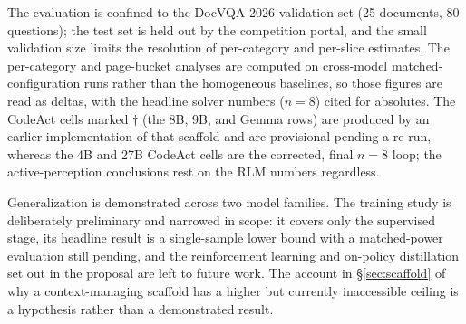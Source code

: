The evaluation is confined to the DocVQA-2026 validation set (25 documents, 80 questions); the test set is held out by the competition portal, and the small validation size limits the resolution of per-category and per-slice estimates. The per-category and page-bucket analyses are computed on cross-model matched-configuration runs rather than the homogeneous baselines, so those figures are read as deltas, with the headline solver numbers ($n{=}8$) cited for absolutes. The CodeAct cells marked $\dag$ (the 8B, 9B, and Gemma rows) are produced by an earlier implementation of that scaffold and are provisional pending a re-run, whereas the 4B and 27B CodeAct cells are the corrected, final $n{=}8$ loop; the active-perception conclusions rest on the RLM numbers regardless.

Generalization is demonstrated across two model families. The training study is deliberately preliminary and narrowed in scope: it covers only the supervised stage, its headline result is a single-sample lower bound with a matched-power evaluation still pending, and the reinforcement learning and on-policy distillation set out in the proposal are left to future work. The account in \S\ref{sec:scaffold} of why a context-managing scaffold has a higher but currently inaccessible ceiling is a hypothesis rather than a demonstrated result.
